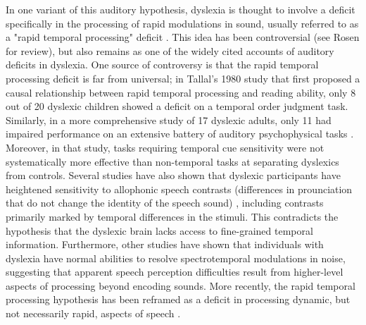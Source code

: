 \documentclass[../uwthesis.tex]{subfiles}
\begin{document}
In one variant of this auditory hypothesis, dyslexia is thought to involve a deficit specifically in the processing of rapid modulations in sound, usually referred to as a "rapid temporal processing" deficit \cite{Merzenich1996TemporalTraining,Tallal1980AuditoryChildren,Tallal1996LanguageSpeech}. This idea has been controversial (see Rosen \cite{Rosen2003AuditoryAnything} for review), but also remains as one of the widely cited accounts of auditory deficits in dyslexia. One source of controversy is that the rapid temporal processing deficit is far from universal; in Tallal's 1980 study \cite{Tallal1980AuditoryChildren} that first proposed a causal relationship between rapid temporal processing and reading ability, only 8 out of 20 dyslexic children showed a deficit on a temporal order judgment task. Similarly, in a more comprehensive study of 17 dyslexic adults, only 11 had impaired performance on an extensive battery of auditory psychophysical tasks \cite{Ramus2003TheoriesAdults}. Moreover, in that study, tasks requiring temporal cue sensitivity were not systematically more effective than non-temporal tasks at separating dyslexics from controls. Several studies have also shown that dyslexic participants have heightened sensitivity to allophonic speech contrasts (differences in prounciation that do not change the identity of the speech sound) \cite{Bogliotti2008DiscriminationControls,Noordenbos2015TheMeta-Analysis,Serniclaes2004AllophonicDyslexia}, including contrasts primarily marked by temporal differences in the stimuli. This contradicts the hypothesis that the dyslexic brain lacks access to fine-grained temporal information. Furthermore, other studies have shown that individuals with dyslexia have normal abilities to resolve spectrotemporal modulations in noise, suggesting that apparent speech perception difficulties result from higher-level aspects of processing beyond encoding sounds. \cite{Calcus2018PeripheralChildren,Dole2012Speech-in-noiseConfiguration,Ziegler2009Speech-perception-in-noiseDyslexia} More recently, the rapid temporal processing hypothesis has been reframed as a deficit in processing dynamic, but not necessarily rapid, aspects of speech \cite{Boets2011PreschoolProblems,Law2014TheDyslexia,Poelmans2011ReducedDyslexia}.
\end{document}
